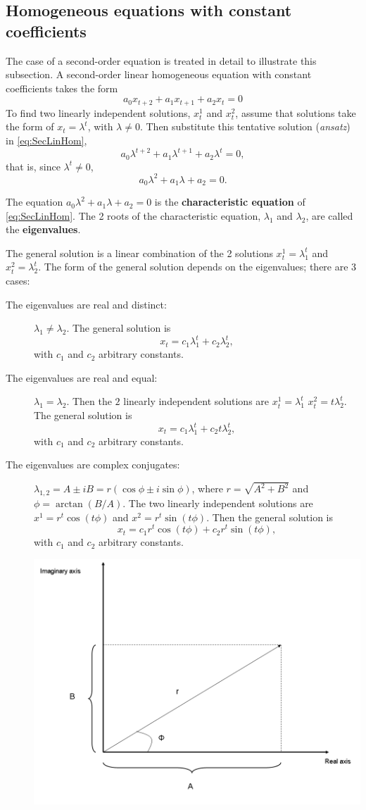 \subsection{Homogeneous equations with constant coefficients}
The case of a second-order equation is treated in detail to illustrate this subsection.
A second-order linear homogeneous equation with constant coefficients takes the form
\begin{equation}\label{eq:SecLinHom}
a_0x_{t+2}+a_1x_{t+1}+ a_2 x_{t}=0
\end{equation}
To find two linearly independent solutions, $x_t^1$ and $x_t^2$, assume that solutions take the form of 
$x_t=\lambda^t$, with $\lambda \not= 0$. Then substitute this tentative solution (\emph{ansatz}) in \eqref{eq:SecLinHom},
$$a_0\lambda ^{t+2}+a_1\lambda ^{t+1}+ a_2 \lambda ^{t}=0,$$
that is, since $\lambda^t\neq 0$,
$$a_0\lambda ^{2}+a_1\lambda + a_2 =0.$$

The equation $a_0\lambda ^{2}+a_1\lambda + a_2 =0$ is the \textbf{characteristic equation} of \eqref{eq:SecLinHom}. The 2 roots of the characteristic equation, $\lambda_1$ and $\lambda_2$, are called the \textbf{eigenvalues}.

The general solution is a linear combination of the 2 solutions $x_t^1=\lambda_1^t$ and $x_t^2=\lambda_2^t$. The form of the general solution depends on the eigenvalues; there are 3 cases:
\begin{description}
\item[The eigenvalues are real and distinct:] $\lambda _1 \not = \lambda _2 $. The general solution is
$$x_t=c_1\lambda _1 ^t+c_2\lambda _2 ^t,$$
with $c_1$ and $c_2$ arbitrary constants.
\item[The eigenvalues are real and equal:] $\lambda _1  = \lambda _2 $. Then the $2$ linearly independent solutions are  $x_t^1=\lambda _1^t$ $x_t^2=t\lambda _2^t$. 
The general solution is
$$x_t=c_1\lambda _1 ^t+c_2t\lambda _2 ^t,$$
with $c_1$ and $c_2$ arbitrary constants.
\item[The eigenvalues are complex conjugates:] $\lambda _{1,2}=A\pm iB=r(\cos \phi \pm i \sin \phi)$, where $r=\sqrt{A^2+B^2}$ and $\phi=\arctan(B/A)$. The two linearly independent solutions are $x^1=r^t\cos(t\phi)$ and $x^2=r^t\sin (t\phi)$.
Then the general solution is
$$x_t=c_1 r^t\cos(t\phi)+c_2r^t\sin (t\phi),$$
with $c_1$ and $c_2$ arbitrary constants.
\begin{center}
\includegraphics[width=.5\textwidth]{figs_steph/FigurePhase}
\end{center}
\end{description}


